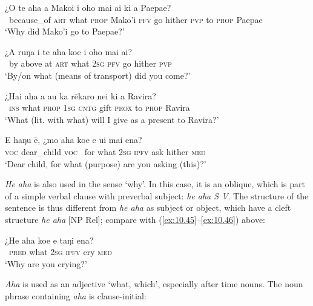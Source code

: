 \ea\label{ex:10.47}
\gll ¿{\ꞌ}O te aha a Mako{\ꞌ}i i oho mai ai ki a Paepae? \\
~because\_of \textsc{art} what \textsc{prop} Mako’i \textsc{pfv} go hither \textsc{pvp} to \textsc{prop} Paepae \\

\glt 
‘Why did Mako’i go to Paepae?’ \textstyleExampleref{[R615.699]} 
\z

\ea\label{ex:10.48}
\gll ¿A ruŋa i te aha koe i oho mai ai? \\
~by above at \textsc{art} what \textsc{2sg} \textsc{pfv} go hither \textsc{pvp} \\

\glt 
‘By/on what (means of transport) did you come?’ \textstyleExampleref{[R245.178]} 
\z

\ea\label{ex:10.49}
\gll ¿Hai aha a au ka rēkaro nei ki a Ravira? \\
~\textsc{ins} what \textsc{prop} \textsc{1sg} \textsc{cntg} gift \textsc{prox} to \textsc{prop} Ravira \\

\glt 
‘What (lit. with what) will I give as a present to Ravira?’ \textstyleExampleref{[R175.002]} 
\z

\ea\label{ex:10.50}
\gll E haŋu ē, ¿mo aha koe e {\ꞌ}ui mai ena? \\
\textsc{voc} dear\_child \textsc{voc} ~for what \textsc{2sg} \textsc{ipfv} ask hither \textsc{med} \\

\glt 
‘Dear child, for what (purpose) are you asking (this)?’ \textstyleExampleref{[R250.114]} 
\z

\textit{He aha} is also used in the sense ‘why’. In this case, it is an oblique, which is part of a simple verbal clause with preverbal subject: \textit{he aha S V}. The structure of the sentence is thus different from \textit{he aha} as subject or object, which have a cleft structure \textit{he aha} [NP Rel]; compare  with (\ref{ex:10.45}–\ref{ex:10.46}) above: 

\ea\label{ex:10.51}
\gll ¿He aha koe e taŋi ena? \\
~\textsc{pred} what \textsc{2sg} \textsc{ipfv} cry \textsc{med} \\

\glt 
‘Why are you crying?’ \textstyleExampleref{[Ley-9-55.064]}
\z

\textit{Aha} is used as an adjective ‘what, which’, especially after time nouns. The noun phrase containing \textit{aha} is clause-initial:

